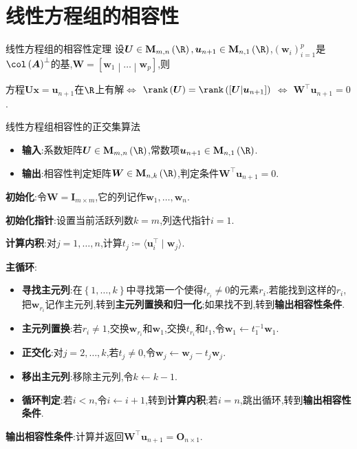 \section{线性方程组的相容性}

\begin{theorem}{线性方程组的相容性定理}{}
	设$\boldsymbol{U}\in\mathbf{M}_{m,n}\left(\R\right),\boldsymbol{u}_{n+1}\in\mathbf{M}_{n,1}\left(\R\right)$,$\left(\boldsymbol{w}_{i}\right)_{i=1}^{p}$是$\col\left(\boldsymbol{A}\right)^{\perp}$的基,$\boldsymbol{W}=\left[\boldsymbol{w}_{1}\middle|\ldots\middle|\boldsymbol{w}_{p}\right]$,则
	\begin{center}
		方程$\boldsymbol{U}\boldsymbol{x}=\boldsymbol{u}_{n+1}$在$\R$上有解$\iff$ $\rank\left(\boldsymbol{U}\right)=\rank\left(\left[\boldsymbol{U}\middle|\boldsymbol{u}_{n+1}\right]\right)$ $\iff$ $\boldsymbol{W}^{\top}\boldsymbol{u}_{n+1}=0$.
	\end{center}
\end{theorem}

\begin{algorithm}{线性方程组相容性的正交集算法}{}
	\begin{itemize}
		\item \textbf{输入}:系数矩阵$\boldsymbol{U}\in\mathbf{M}_{m,n}\left(\R\right)$,常数项$\boldsymbol{u}_{n+1}\in\mathbf{M}_{n,1}\left(\R\right)$.
		\item \textbf{输出}:相容性判定矩阵$\boldsymbol{W}\in\mathbf{M}_{n,k}\left(\R\right)$,判定条件$\boldsymbol{W}^{\top}\boldsymbol{u}_{n+1}=0$.
	\end{itemize}
	\textbf{初始化}:令$\boldsymbol{W}=\boldsymbol{I}_{m\times m}$,它的列记作$\boldsymbol{w}_{1},\ldots,\boldsymbol{w}_{n}$.
	
	\textbf{初始化指针}:设置当前活跃列数$k=m$,列迭代指针$i=1$.
	
	\textbf{计算内积}:对$j=1,\ldots,n$,计算$t_{j}\coloneq\langle\boldsymbol{u}_{i}^{\top}\mid\boldsymbol{w}_{j}\rangle$.
	
	\textbf{主循环}:
	\begin{itemize}
		\item \textbf{寻找主元列}:在$\left\{1,\ldots,k\right\}$中寻找第一个使得$t_{r_{i}}\neq 0$的元素$r_{i}$.若能找到这样的$r_{i}$,把$\boldsymbol{w}_{r_{i}}$记作主元列,转到\textbf{主元列置换和归一化};如果找不到,转到\textbf{输出相容性条件}.
		\item \textbf{主元列置换}:若$r_{i}\neq 1$,交换$\boldsymbol{w}_{r_{i}}$和$\boldsymbol{w}_{1}$,交换$t_{r_{i}}$和$t_{1}$,令$\boldsymbol{w}_{1}\leftarrow t_{1}^{-1}\boldsymbol{w}_{1}$.
		\item \textbf{正交化}:对$j=2,\ldots,k$,若$t_{j}\neq 0$,令$\boldsymbol{w}_{j}\leftarrow\boldsymbol{w}_{j}-t_{j}\boldsymbol{w}_{j}$.
		\item \textbf{移出主元列}:移除主元列,令$k\leftarrow k-1$.
		\item \textbf{循环判定}:若$i<n$,令$i\leftarrow i+1$,转到\textbf{计算内积};若$i=n$,跳出循环,转到\textbf{输出相容性条件}.
	\end{itemize}
	\textbf{输出相容性条件}:计算并返回$\boldsymbol{W}^{\top}\boldsymbol{u}_{n+1}=\boldsymbol{O}_{n\times 1}$.
\end{algorithm}
